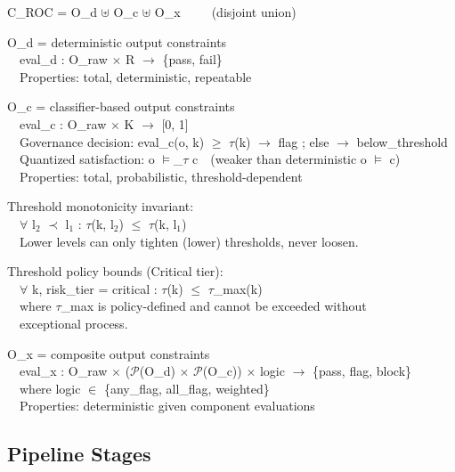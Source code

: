 \begin{claddisp}
C\_ROC = O\_d $\uplus$ O\_c $\uplus$ O\_x~~~~~(disjoint union)
\par\smallskip
O\_d = deterministic output constraints\\
~~eval\_d : O\_raw $\times$ R $\to$ \{pass, fail\}\\
~~Properties: total, deterministic, repeatable
\par\smallskip
O\_c = classifier-based output constraints\\
~~eval\_c : O\_raw $\times$ K $\to$ [0, 1]\\
~~Governance decision: eval\_c(o, k) $\geq$ $\tau$(k) $\to$ flag ; else $\to$ below\_threshold\\
~~Quantized satisfaction: o $\vDash$\_$\tau$ c~~(weaker than deterministic o $\vDash$ c)\\
~~Properties: total, probabilistic, threshold-dependent
\par\smallskip
Threshold monotonicity invariant:\\
~~$\forall$ l$_2$ $\prec$ l$_1$ : $\tau$(k, l$_2$) $\leq$ $\tau$(k, l$_1$)\\
~~Lower levels can only tighten (lower) thresholds, never loosen.
\par\smallskip
Threshold policy bounds (Critical tier):\\
~~$\forall$ k, risk\_tier = critical : $\tau$(k) $\leq$ $\tau$\_max(k)\\
~~where $\tau$\_max is policy-defined and cannot be exceeded without\\
~~exceptional process.
\par\smallskip
O\_x = composite output constraints\\
~~eval\_x : O\_raw $\times$ ($\mathcal{P}$(O\_d) $\times$ $\mathcal{P}$(O\_c)) $\times$ logic $\to$ \{pass, flag, block\}\\
~~where logic $\in$ \{any\_flag, all\_flag, weighted\}\\
~~Properties: deterministic given component evaluations
\end{claddisp}


\subsection{Pipeline Stages}
\label{sec:formal-model-A-2-3}


